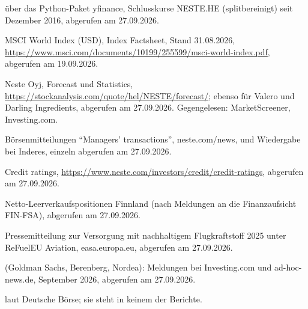 \begin{description}\small
\item[\label{quelle:kurse}Yahoo Finance] \"uber das Python-Paket yfinance, Schlusskurse
  NESTE.HE (splitbereinigt) seit Dezember 2016, abgerufen am 27.09.2026.
\item[\label{quelle:msci}MSCI Inc.,] MSCI World Index (USD), Index Factsheet, Stand
  31.08.2026, \url{https://www.msci.com/documents/10199/255599/msci-world-index.pdf},
  abgerufen am 19.09.2026.
\item[\label{quelle:konsens}stockanalysis.com,] Neste Oyj, Forecast und Statistics,
  \url{https://stockanalysis.com/quote/hel/NESTE/forecast/}; ebenso f\"ur Valero und Darling
  Ingredients, abgerufen am 27.09.2026. Gegengelesen: MarketScreener, Investing.com.
\item[\label{quelle:dd}Neste Corporation,] B\"orsenmitteilungen \enquote{Managers'
  transactions}, neste.com/news, und Wiedergabe bei Inderes, einzeln abgerufen am 27.09.2026.
\item[\label{quelle:rating}Neste Corporation,] Credit ratings,
  \url{https://www.neste.com/investors/credit/credit-ratings}, abgerufen am 27.09.2026.
\item[\label{quelle:short}shortregister.com,] Netto-Leerverkaufspositionen Finnland (nach
  Meldungen an die Finanzaufsicht FIN-FSA), abgerufen am 27.09.2026.
\item[\label{quelle:easa}EASA,] Pressemitteilung zur Versorgung mit nachhaltigem
  Flugkraftstoff 2025 unter ReFuelEU Aviation, easa.europa.eu, abgerufen am 27.09.2026.
\item[Kursziele einzelner H\"auser] (Goldman Sachs, Berenberg, Nordea): Meldungen bei
  Investing.com und ad-hoc-news.de, September 2026, abgerufen am 27.09.2026.
\item[ISIN] \Isin{} laut Deutsche B\"orse; sie steht in keinem der Berichte.
\end{description}
